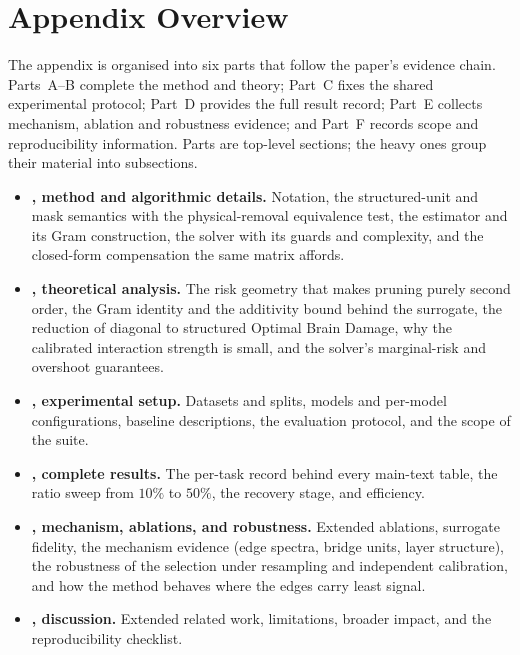 

\section*{Appendix Overview}

The appendix is organised into six parts that follow the paper's evidence chain. Parts~A--B complete
the method and theory; Part~C fixes the shared experimental protocol; Part~D provides the full result
record; Part~E collects mechanism, ablation and robustness evidence; and Part~F records scope and
reproducibility information. Parts are top-level sections; the heavy ones group their material into
subsections.

\begin{itemize}\itemsep2pt
\item \textbf{, method and algorithmic details.} Notation, the structured-unit and
mask semantics with the physical-removal equivalence test, the estimator and its Gram construction,
the solver with its guards and complexity, and the closed-form compensation the same matrix affords.
\item \textbf{, theoretical analysis.} The risk geometry that makes pruning purely
second order, the Gram identity and the additivity bound behind the surrogate, the reduction of
diagonal \method to structured Optimal Brain Damage, why the calibrated interaction strength is
small, and the solver's marginal-risk and overshoot guarantees.
\item \textbf{, experimental setup.} Datasets and splits, models and per-model
configurations, baseline descriptions, the evaluation protocol, and the scope of the suite.
\item \textbf{, complete results.} The per-task record behind every main-text
table, the ratio sweep from $10\%$ to $50\%$, the recovery stage, and efficiency.
\item \textbf{, mechanism, ablations, and robustness.} Extended ablations, surrogate fidelity,
the mechanism evidence (edge spectra, bridge units, layer structure), the robustness of the
selection under resampling and independent calibration, and how the method behaves where the edges
carry least signal.
\item \textbf{, discussion.} Extended related work, limitations, broader
impact, and the reproducibility checklist.
\end{itemize}

